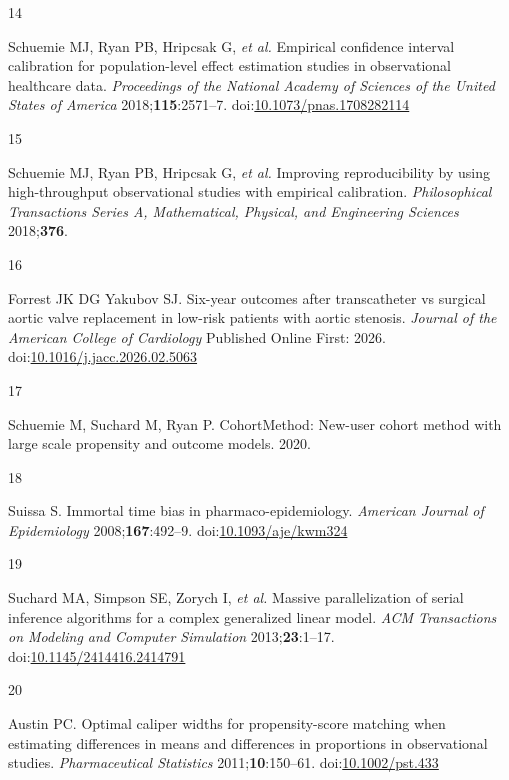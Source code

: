 \documentclass[
  12pt,
]{article}
\newlength{\cslhangindent}
\newlength{\csllabelwidth}
\newenvironment{CSLReferences}[2] %
 {\begin{list}{}{%
  \setlength{\itemindent}{0pt}
  \setlength{\leftmargin}{0pt}
  \setlength{\parsep}{0pt}
  \ifodd #1
   \setlength{\leftmargin}{\cslhangindent}
   \setlength{\itemindent}{-1\cslhangindent}
  \fi
  \setlength{\itemsep}{#2\baselineskip}}}
 {\end{list}}
\newcommand{\CSLLeftMargin}[1]{\parbox[t]{\csllabelwidth}{\strut#1\strut}}
\newcommand{\CSLRightInline}[1]{\parbox[t]{\linewidth - \csllabelwidth}{\strut#1\strut}}
\begin{document}
\begin{CSLReferences}{0}{1}
\CSLLeftMargin{14 }%
\CSLRightInline{Schuemie MJ, Ryan PB, Hripcsak G, \emph{et al.}
Empirical confidence interval calibration for population-level effect
estimation studies in observational healthcare data. \emph{Proceedings
of the National Academy of Sciences of the United States of America}
2018;\textbf{115}:2571--7.
doi:\href{https://doi.org/10.1073/pnas.1708282114}{10.1073/pnas.1708282114}}

\CSLLeftMargin{15 }%
\CSLRightInline{Schuemie MJ, Ryan PB, Hripcsak G, \emph{et al.}
Improving reproducibility by using high-throughput observational studies
with empirical calibration. \emph{Philosophical Transactions Series A,
Mathematical, Physical, and Engineering Sciences} 2018;\textbf{376}.}

\CSLLeftMargin{16 }%
\CSLRightInline{Forrest JK DG Yakubov SJ. Six-year outcomes after
transcatheter vs surgical aortic valve replacement in low-risk patients
with aortic stenosis. \emph{Journal of the American College of
Cardiology} Published Online First: 2026.
doi:\href{https://doi.org/10.1016/j.jacc.2026.02.5063}{10.1016/j.jacc.2026.02.5063}}

\CSLLeftMargin{17 }%
\CSLRightInline{Schuemie M, Suchard M, Ryan P. {CohortMethod}: New-user
cohort method with large scale propensity and outcome models. 2020.}

\CSLLeftMargin{18 }%
\CSLRightInline{Suissa S. Immortal time bias in pharmaco-epidemiology.
\emph{American Journal of Epidemiology} 2008;\textbf{167}:492--9.
doi:\href{https://doi.org/10.1093/aje/kwm324}{10.1093/aje/kwm324}}

\CSLLeftMargin{19 }%
\CSLRightInline{Suchard MA, Simpson SE, Zorych I, \emph{et al.} Massive
parallelization of serial inference algorithms for a complex generalized
linear model. \emph{ACM Transactions on Modeling and Computer
Simulation} 2013;\textbf{23}:1--17.
doi:\href{https://doi.org/10.1145/2414416.2414791}{10.1145/2414416.2414791}}

\CSLLeftMargin{20 }%
\CSLRightInline{Austin PC. Optimal caliper widths for propensity-score
matching when estimating differences in means and differences in
proportions in observational studies. \emph{Pharmaceutical Statistics}
2011;\textbf{10}:150--61.
doi:\href{https://doi.org/10.1002/pst.433}{10.1002/pst.433}}

\end{CSLReferences}
\end{document}
